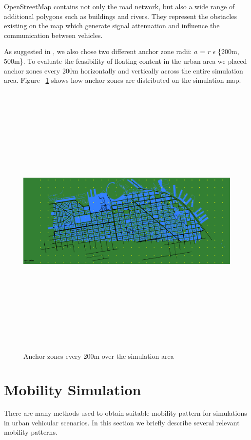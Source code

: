OpenStreetMap contains not only the road network, but also a wide range of
additional polygons such as buildings and rivers. They represent the obstacles
existing on the map which generate signal attenuation and influence the
communication between vehicles.

As suggested in \cite{percomfloatingcontent}, we also chose two different anchor
zone radii: $a$ = $r$ $\epsilon$ \{200m, 500m\}. To evaluate the feasibility of
floating content in the urban area we placed anchor zones every 200m
horizontally and vertically across the entire simulation area. Figure
~\ref{fig:anchor_zones_grid} shows how anchor zones are distributed on the
simulation map.

\begin{figure}[t]
 \centering
 \includegraphics[width=15cm,height=14cm,keepaspectratio]{img/SanFrancisco_Anchors}
 \caption{Anchor zones every 200m over the simulation area}
 \label{fig:anchor_zones_grid}
\end{figure}

\section{Mobility Simulation}

There are many methods used to obtain suitable mobility pattern for simulations
in urban vehicular scenarios. In this section we briefly describe several
relevant mobility patterns.

